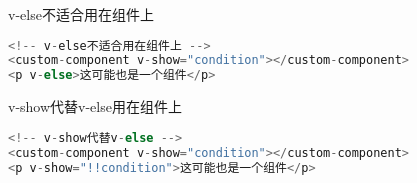 \begin{compactitem}
\item v-else不适合用在组件上

\begin{lstlisting}[language=JavaScript]
<!-- v-else不适合用在组件上 -->
<custom-component v-show="condition"></custom-component>
<p v-else>这可能也是一个组件</p>
\end{lstlisting}

\item v-show代替v-else用在组件上

\begin{lstlisting}[language=JavaScript]
<!-- v-show代替v-else -->
<custom-component v-show="condition"></custom-component>
<p v-show="!!condition">这可能也是一个组件</p>
\end{lstlisting}

\end{compactitem}





\begin{lstlisting}[language=JavaScript]

\end{lstlisting}




\begin{lstlisting}[language=JavaScript]

\end{lstlisting}




\begin{lstlisting}[language=JavaScript]

\end{lstlisting}




\begin{lstlisting}[language=JavaScript]

\end{lstlisting}




\begin{lstlisting}[language=JavaScript]

\end{lstlisting}




\begin{lstlisting}[language=JavaScript]

\end{lstlisting}


